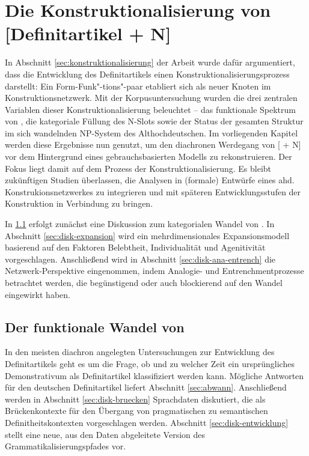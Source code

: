 \chapter{Die Konstruktionalisierung von [Definitartikel + N]} \label{bicpic}

In Abschnitt \ref{sec:konstruktionalisierung} der Arbeit wurde dafür argumentiert, dass die Entwicklung des Definitartikels einen Konstruktionalisierungsprozess darstellt: Ein Form-Funk"-tions"-paar etabliert sich als neuer Knoten im Konstruktionsnetzwerk. Mit der Korpusuntersuchung wurden die drei zentralen Variablen dieser Konstruktionalisierung beleuchtet -- das funktionale Spektrum von , die kategoriale Füllung des N-Slots sowie der Status der gesamten Struktur im sich wandelnden NP-System des Althochdeutschen. Im vorliegenden Kapitel werden diese Ergebnisse nun genutzt, um den diachronen Werdegang von [ + N] vor dem Hintergrund eines gebrauchsbasierten Modells zu rekonstruieren. 
Der Fokus liegt damit auf dem Prozess der Konstruktionalisierung. Es bleibt zukünftigen Studien überlassen, die Analysen in (formale) Entwürfe eines ahd. Konstrukionsnetzwerkes zu integrieren und  mit späteren Entwicklungsstufen der Konstruktion in Verbindung zu bringen. 

In \ref{diskussion:der} erfolgt zunächst eine Diskussion zum kategorialen Wandel von .  In Abschnitt \ref{sec:disk-expansion} wird ein mehrdimensionales Expansionsmodell basierend auf den Faktoren Belebtheit,  Individualität und Agenitivität vorgeschlagen. Anschließend wird in Abschnitt \ref{sec:disk-ana-entrench} die Netzwerk-Perspektive eingenommen, indem Analogie- und Entrenchmentprozesse betrachtet werden, die begünstigend oder auch blockierend auf den Wandel eingewirkt haben. 

\section{Der funktionale Wandel von } \label{diskussion:der}

In den meisten diachron angelegten Untersuchungen zur Entwicklung des Definitartikels geht es um die Frage, ob und zu welcher Zeit ein ursprüngliches Demonstrativum als Definitartikel klassifiziert werden kann. Mögliche Antworten für den deutschen Definitartikel liefert Abschnitt \ref{sec:abwann}. Anschließend werden in Abschnitt \ref{sec:disk-bruecken} Sprachdaten diskutiert, die  als Brückenkontexte für den Übergang von pragmatischen zu semantischen Definitheitskontexten vorgeschlagen werden. Abschnitt \ref{sec:disk-entwicklung} stellt eine neue, aus den Daten abgeleitete Version des Grammatikalisierungspfades vor. 

